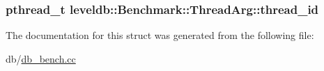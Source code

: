 \subsubsection[{thread\+\_\+id}]{\setlength{\rightskip}{0pt plus 5cm}pthread\+\_\+t leveldb\+::\+Benchmark\+::\+Thread\+Arg\+::thread\+\_\+id}\label{structleveldb_1_1_benchmark_1_1_thread_arg_abcb95247c2596d3911b668d63460ea28}


The documentation for this struct was generated from the following file\+:\begin{DoxyCompactItemize}
\item 
db/\hyperlink{db__bench_8cc}{db\+\_\+bench.\+cc}\end{DoxyCompactItemize}
